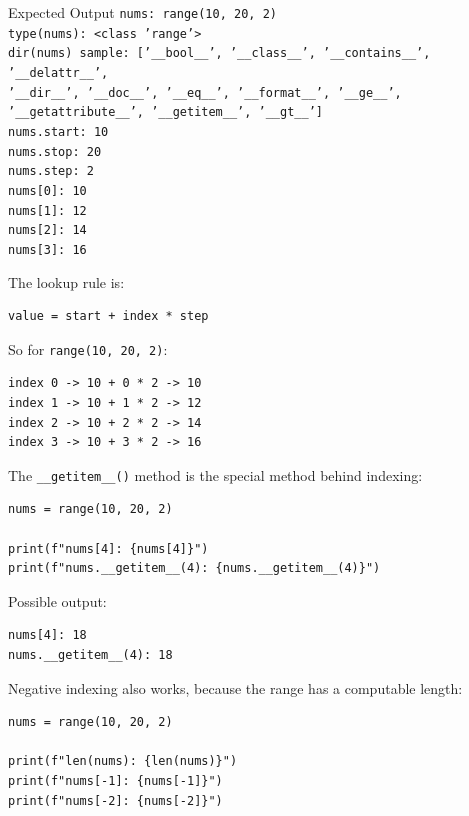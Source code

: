 \begin{iobox}{Expected Output}
\texttt{nums: range(10, 20, 2)} \\
\texttt{type(nums): <class 'range'>} \\
\texttt{dir(nums) sample: ['\_\_bool\_\_', '\_\_class\_\_', '\_\_contains\_\_', '\_\_delattr\_\_',} \\
\texttt{'\_\_dir\_\_', '\_\_doc\_\_', '\_\_eq\_\_', '\_\_format\_\_', '\_\_ge\_\_',} \\
\texttt{'\_\_getattribute\_\_', '\_\_getitem\_\_', '\_\_gt\_\_']} \\
\texttt{nums.start: 10} \\
\texttt{nums.stop: 20} \\
\texttt{nums.step: 2} \\
\texttt{nums[0]: 10} \\
\texttt{nums[1]: 12} \\
\texttt{nums[2]: 14} \\
\texttt{nums[3]: 16} \\
\end{iobox}


The lookup rule is:

\begin{verbatim}
value = start + index * step
\end{verbatim}

So for \texttt{range(10, 20, 2)}:

\begin{verbatim}
index 0 -> 10 + 0 * 2 -> 10
index 1 -> 10 + 1 * 2 -> 12
index 2 -> 10 + 2 * 2 -> 14
index 3 -> 10 + 3 * 2 -> 16
\end{verbatim}

The \texttt{\_\_getitem\_\_()} method is the special method behind indexing:

\begin{verbatim}
nums = range(10, 20, 2)

print(f"nums[4]: {nums[4]}")
print(f"nums.__getitem__(4): {nums.__getitem__(4)}")
\end{verbatim}

Possible output:

\begin{verbatim}
nums[4]: 18
nums.__getitem__(4): 18
\end{verbatim}

Negative indexing also works, because the range has a computable length:

\begin{verbatim}
nums = range(10, 20, 2)

print(f"len(nums): {len(nums)}")
print(f"nums[-1]: {nums[-1]}")
print(f"nums[-2]: {nums[-2]}")
\end{verbatim}

